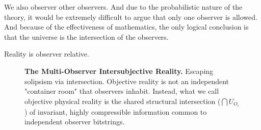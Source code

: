 \newpage

We also observer other observers. And due to the probabilistic nature
of the theory, it would be extremely difficult to argue that only one
observer is allowed. And because of the effectiveness of mathematics,
the only logical conclusion is that the universe is the intersection
of the observers.

Reality is observer relative. 


\begin{figure}[htbp]
\centering
{}
\caption{\textbf{The Multi-Observer Intersubjective Reality.} Escaping solipsism via intersection. Objective reality is not an independent "container room" that observers inhabit. Instead, what we call objective physical reality is the shared structural intersection ($\bigcap U_{O_i}$) of invariant, highly compressible information common to independent observer bitstrings.}
\label{fig:diag4}
\end{figure}


